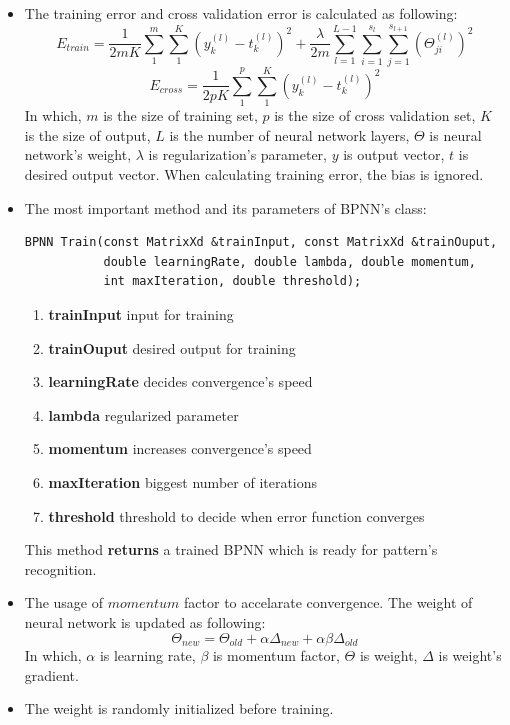 \documentclass[a4paper, 11pt]{article}
\begin{document}
\begin{itemize}
\item The training error and cross validation error is calculated as following:
  \[E_{train}=\frac{1}{2mK}\sum\limits_{1}^{m}{\sum\limits_{1}^{K}{(y_{k}^{(l)}-t_{k}^{(l)})^2}}+
  \frac{\lambda}{2m} \sum\limits_{l=1}^{L-1} {\sum\limits_{i=1}^{s_l} {\sum\limits_{j=1}^{s_{l+1}}{(\Theta_{ji}^{(l)})^2} } } \]
  \[E_{cross}=\frac{1}{2pK}\sum\limits_{1}^{p}{\sum\limits_{1}^{K}{(y_{k}^{(l)}-t_{k}^{(l)})^2}}\]
  In which, $m$ is the size of training set, $p$ is the size of cross validation set, $K$ is the size of output, $L$ is the number of neural network layers, $\Theta$ is neural network's weight, $\lambda$ is regularization's parameter, $y$ is output vector, $t$ is desired output vector. When calculating training error, the bias is ignored.

\item The most important method and its parameters of BPNN's class:
\begin{lstlisting}
BPNN Train(const MatrixXd &trainInput, const MatrixXd &trainOuput, 
           double learningRate, double lambda, double momentum, 
           int maxIteration, double threshold);
\end{lstlisting}
  \begin{enumerate}
  \item \textbf{trainInput} input for training
  \item \textbf{trainOuput} desired output for training
  \item \textbf{learningRate} decides convergence's speed
  \item \textbf{lambda} regularized parameter
  \item \textbf{momentum} increases convergence's speed
  \item \textbf{maxIteration} biggest number of iterations
  \item \textbf{threshold} threshold to decide when error function converges
  \end{enumerate}
  This method \textbf{returns} a trained BPNN which is ready for pattern's recognition. 
\item The usage of $momentum$ factor to accelarate convergence. The weight of neural network is updated as following:
  \[ \Theta_{new} = \Theta_{old} +\alpha\Delta_{new} + \alpha\beta\Delta_{old} \]
  In which, $\alpha$ is learning rate, $\beta$ is momentum factor, $\Theta$ is weight, $\Delta$ is weight's gradient.
\item The weight is randomly initialized before training. 
\end{itemize}
\end{document}
